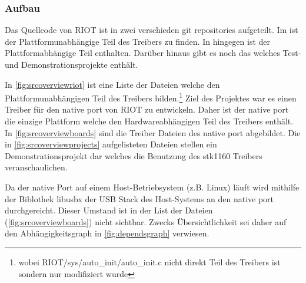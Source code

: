 \subsubsection{Aufbau}
Das Quellcode von RIOT ist in zwei verschieden git repositories aufgeteilt. Im 
\riotrepo{} ist der Plattformunabhängige Teil des Treibers zu finden. In \boardsrepo{} hingegen ist der Plattformabhängige Teil enthalten. Darüber hinaus gibt es noch das \projectsrepo{} welches Test- und Demonstrationsprojekte enthält.

In \autoref{fig:srcoverviewriot} ist eine Liste der Dateien welche den Plattformunabhängigen Teil des Treibers bilden.\footnote{wobei RIOT/sys/auto\_init/auto\_init.c nicht direkt Teil des Treibers ist sondern nur modifiziert wurde} Ziel des Projektes war es einen Treiber für den native port von RIOT zu entwickeln. Daher ist der native port die einzige Plattform welche den Hardwareabhängigen Teil des Treibers enthält. In \autoref{fig:srcoverviewboards} sind die Treiber Dateien des native port abgebildet. Die in \autoref{fig:srcoverviewprojects} aufgelisteten Dateien stellen ein Demonstrationsprojekt dar welches die Benutzung des stk1160 Treibers veranschaulichen. 

Da der native Port auf einem Host-Betriebsystem (z.B. Linux) läuft wird mithilfe der Biblothek libusbx der USB Stack des Host-Systems an den native port durchgereicht. Dieser Umstand ist in der List der Dateien (\autoref{fig:srcoverviewboards}) nicht sichtbar. Zwecks Übersichtlichkeit sei daher auf den Abhängigkeitsgraph in \autoref{fig:dependsgraph} verwiesen.    

